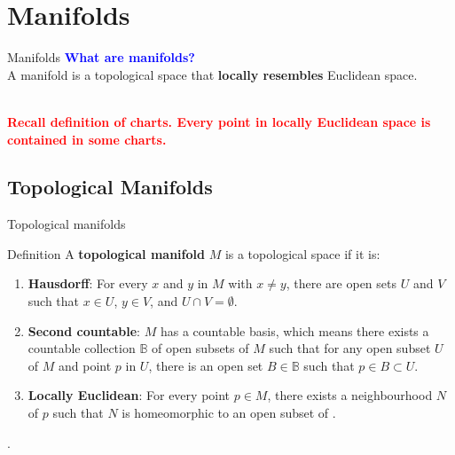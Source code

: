 \documentclass[smaller,xcolor=dvipsnames]{beamer}
\begin{document}
\section{Manifolds}
\begin{frame}{Manifolds}
\textcolor{blue}{\textbf{What are manifolds?}}
\pause
\vspace{0.5cm}
\\
A manifold is a topological space that {\bf locally resembles} Euclidean space.
\pause
\begin{minipage}[t]{1\linewidth}
\vspace{1cm}
\centering
{}
\end{minipage}
\\
\vspace{1cm} \pause
\textcolor{red}{\textbf{Recall definition of charts. Every point in locally Euclidean space is contained in some charts.}}\\
\end{frame}

\subsection{Topological Manifolds}
\begin{frame}{Topological manifolds}
 \begin{block}{Definition}
A {\bf topological manifold} $M$ is a topological space if it is:\\
\pause
\begin{enumerate}
    \item {\bf Hausdorff}: For every $x$ and $y$ in $M$ with $x \neq y$, there are open sets $U$ and $V$ such that $x \in U$, $y \in V$, and $U \cap V=\emptyset$.
    \pause \\
    \item {\bf Second countable}: $M$ has a countable basis, which means there exists a countable collection $\mathbb{B}$ of open subsets of $M$ such that for any open subset $U$ of $M$ and point $p$ in $U$, there is an open set $B \in \mathbb{B}$ such that $p \in B \subset U$.
    \pause \\
    \item {\bf Locally Euclidean}: For every point $p\in M$, there exists a neighbourhood $N$ of $p$ such that $N$ is homeomorphic to an open subset of \rn.
    \end{enumerate}.
    \end{block}

\end{frame}
\end{document}
